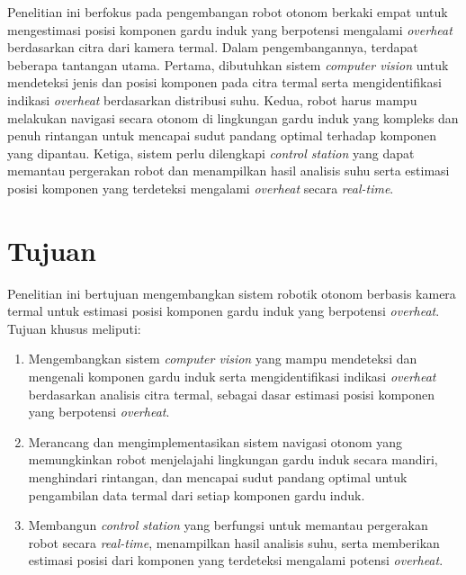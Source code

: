 Penelitian ini berfokus pada pengembangan robot otonom berkaki empat untuk mengestimasi posisi komponen gardu induk yang berpotensi mengalami \emph{overheat} berdasarkan citra dari kamera termal. Dalam pengembangannya, terdapat beberapa tantangan utama. Pertama, dibutuhkan sistem \emph{computer vision} untuk mendeteksi jenis dan posisi komponen pada citra termal serta mengidentifikasi indikasi \emph{overheat} berdasarkan distribusi suhu. Kedua, robot harus mampu melakukan navigasi secara otonom di lingkungan gardu induk yang kompleks dan penuh rintangan untuk mencapai sudut pandang optimal terhadap komponen yang dipantau. Ketiga, sistem perlu dilengkapi \emph{control station} yang dapat memantau pergerakan robot dan menampilkan hasil analisis suhu serta estimasi posisi komponen yang terdeteksi mengalami \emph{overheat} secara \emph{real-time}.

\vspace{2ex}


\section{Tujuan}
\label{sec:Tujuan}

Penelitian ini bertujuan mengembangkan sistem robotik otonom berbasis kamera termal untuk estimasi posisi komponen gardu induk yang berpotensi \emph{overheat}. Tujuan khusus meliputi:

\begin{enumerate}
      \item Mengembangkan sistem \emph{computer vision} yang mampu mendeteksi dan mengenali komponen gardu induk serta mengidentifikasi indikasi \emph{overheat} berdasarkan analisis citra termal, sebagai dasar estimasi posisi komponen yang berpotensi \emph{overheat}.
    
      \item Merancang dan mengimplementasikan sistem navigasi otonom yang memungkinkan robot menjelajahi lingkungan gardu induk secara mandiri, menghindari rintangan, dan mencapai sudut pandang optimal untuk pengambilan data termal dari setiap komponen gardu induk.
    
      \item Membangun \emph{control station} yang berfungsi untuk memantau pergerakan robot secara \emph{real-time}, menampilkan hasil analisis suhu, serta memberikan estimasi posisi dari komponen yang terdeteksi mengalami potensi \emph{overheat}.
    \end{enumerate}

